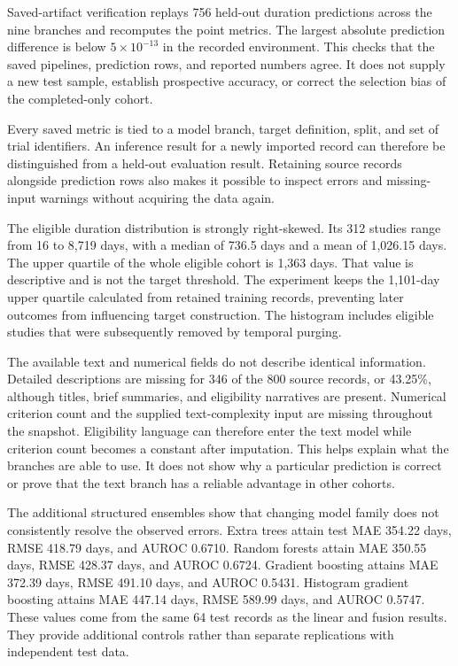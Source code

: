 \documentclass[10pt,letterpaper,twocolumn]{article}
\begin{document}
Saved-artifact verification replays 756 held-out duration predictions across the nine branches and recomputes the point metrics. The largest absolute prediction difference is below $5\times10^{-13}$ in the recorded environment. This checks that the saved pipelines, prediction rows, and reported numbers agree. It does not supply a new test sample, establish prospective accuracy, or correct the selection bias of the completed-only cohort.

Every saved metric is tied to a model branch, target definition, split, and set of trial identifiers. An inference result for a newly imported record can therefore be distinguished from a held-out evaluation result. Retaining source records alongside prediction rows also makes it possible to inspect errors and missing-input warnings without acquiring the data again.


The eligible duration distribution is strongly right-skewed. Its 312 studies range from 16 to 8,719 days, with a median of 736.5 days and a mean of 1,026.15 days. The upper quartile of the whole eligible cohort is 1,363 days. That value is descriptive and is not the target threshold. The experiment keeps the 1,101-day upper quartile calculated from retained training records, preventing later outcomes from influencing target construction. The histogram includes eligible studies that were subsequently removed by temporal purging.

The available text and numerical fields do not describe identical information. Detailed descriptions are missing for 346 of the 800 source records, or 43.25\%, although titles, brief summaries, and eligibility narratives are present. Numerical criterion count and the supplied text-complexity input are missing throughout the snapshot. Eligibility language can therefore enter the text model while criterion count becomes a constant after imputation. This helps explain what the branches are able to use. It does not show why a particular prediction is correct or prove that the text branch has a reliable advantage in other cohorts.

The additional structured ensembles show that changing model family does not consistently resolve the observed errors. Extra trees attain test MAE 354.22 days, RMSE 418.79 days, and AUROC 0.6710. Random forests attain MAE 350.55 days, RMSE 428.37 days, and AUROC 0.6724. Gradient boosting attains MAE 372.39 days, RMSE 491.10 days, and AUROC 0.5431. Histogram gradient boosting attains MAE 447.14 days, RMSE 589.99 days, and AUROC 0.5747. These values come from the same 64 test records as the linear and fusion results. They provide additional controls rather than separate replications with independent test data.
\end{document}
